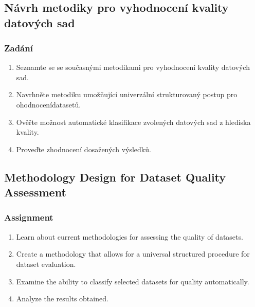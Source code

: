 \chapter*{}

\section*{Návrh metodiky pro vyhodnocení kvality datových sad}

\subsection*{Zadání}

\begin{enumerate}
    \item Seznamte se se současnými metodikami pro vyhodnocení kvality datových sad.
    \item Navrhněte metodiku umožňující univerzální strukturovaný postup pro ohodnocení\linebreak datasetů.
    \item Ověřte možnost automatické klasifikace zvolených datových sad z hlediska kvality.
    \item Proveďte zhodnocení dosažených výsledků.
\end{enumerate}

\vspace{3.5cm}

\section*{Methodology Design for Dataset Quality Assessment}

\subsection*{Assignment}

\begin{enumerate}
    \item Learn about current methodologies for assessing the quality of datasets.
    \item Create a methodology that allows for a universal structured procedure for dataset evaluation.
    \item Examine the ability to classify selected datasets for quality automatically.
    \item Analyze the results obtained.
\end{enumerate}

